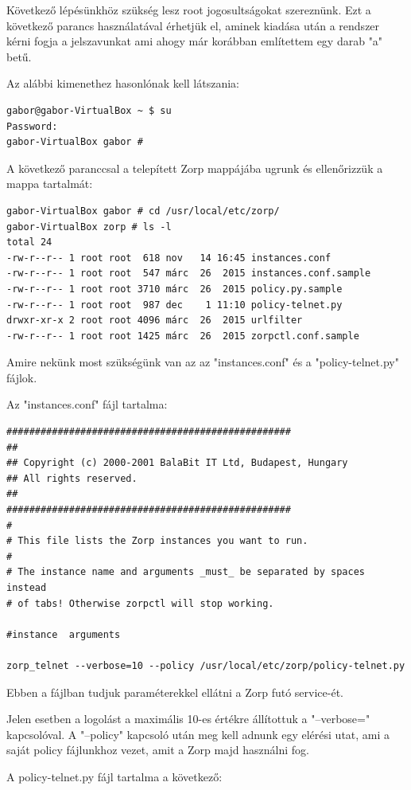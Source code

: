\documentclass[a4paper,12pt,oneside]{report}
\begin{document}
\begin{enumerate}
Következő lépésünkhöz szükség lesz root jogosultságokat szereznünk.
Ezt a következő parancs használatával érhetjük el, aminek kiadása után a rendszer kérni fogja a jelszavunkat ami ahogy már korábban említettem egy darab "a" betű.

Az alábbi kimenethez hasonlónak kell látszania:

\begin{lstlisting}
gabor@gabor-VirtualBox ~ $ su
Password: 
gabor-VirtualBox gabor # 
\end{lstlisting}

A következő paranccsal a telepített Zorp mappájába ugrunk és ellenőrizzük a mappa tartalmát:
\begin{lstlisting}
gabor-VirtualBox gabor # cd /usr/local/etc/zorp/
gabor-VirtualBox zorp # ls -l
total 24
-rw-r--r-- 1 root root  618 nov   14 16:45 instances.conf
-rw-r--r-- 1 root root  547 márc  26  2015 instances.conf.sample
-rw-r--r-- 1 root root 3710 márc  26  2015 policy.py.sample
-rw-r--r-- 1 root root  987 dec    1 11:10 policy-telnet.py
drwxr-xr-x 2 root root 4096 márc  26  2015 urlfilter
-rw-r--r-- 1 root root 1425 márc  26  2015 zorpctl.conf.sample
\end{lstlisting}

Amire nekünk most szükségünk van az az "instances.conf" és a "policy-telnet.py" fájlok.

Az "instances.conf" fájl tartalma: 
\begin{lstlisting}
##################################################
##
## Copyright (c) 2000-2001 BalaBit IT Ltd, Budapest, Hungary
## All rights reserved.
##
##################################################
#
# This file lists the Zorp instances you want to run.
#
# The instance name and arguments _must_ be separated by spaces instead
# of tabs! Otherwise zorpctl will stop working.

#instance  arguments

zorp_telnet --verbose=10 --policy /usr/local/etc/zorp/policy-telnet.py

\end{lstlisting}

Ebben a fájlban tudjuk paraméterekkel ellátni a Zorp futó service-ét.

Jelen esetben a logolást a maximális 10-es értékre állítottuk a "--verbose=" kapcsolóval.
A "--policy" kapcsoló után meg kell adnunk egy elérési utat, ami a saját policy fájlunkhoz vezet, amit a Zorp majd használni fog.

A policy-telnet.py fájl tartalma a következő:


\end{enumerate}
\end{document}
